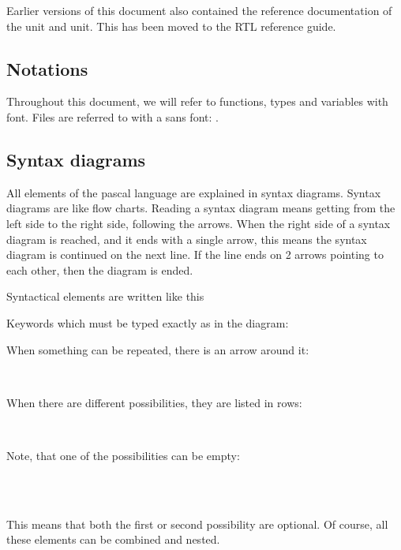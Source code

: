 Earlier versions of this document also contained the reference documentation
of the  unit and  unit. This has been moved to the 
RTL reference guide.

\subsection*{Notations}
Throughout this document, we will refer to functions, types and variables
with  font. Files are referred to with a sans font:
.

\subsection*{Syntax diagrams}
All elements of the pascal language are explained in syntax diagrams.
Syntax diagrams are like flow charts. Reading a syntax diagram means getting
from the left side to the right side, following the arrows.
When the right side of a syntax diagram is reached, and it ends with a single
arrow, this means the syntax diagram is continued on the next line. If
the line ends on 2 arrows pointing to each other, then the diagram is
ended.

Syntactical elements are written like this
\begin{mysyntdiag}
\end{mysyntdiag}
Keywords which must be typed exactly as in the diagram:
\begin{mysyntdiag}
\end{mysyntdiag}
When something can be repeated, there is an arrow around it:
\begin{mysyntdiag}
\begin{rep}[b]  \\ \end{rep}
\end{mysyntdiag}
When there are different possibilities, they are listed in rows:
\begin{mysyntdiag}
\begin{stack}
 \\
\end{stack}
\end{mysyntdiag}
Note, that one of the possibilities can be empty:
\begin{mysyntdiag}
\begin{stack}\\
 \\
\end{stack}
\end{mysyntdiag}
This means that both the first or second possibility are optional.
Of course, all these elements can be combined and nested.


